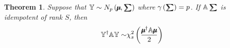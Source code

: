 \documentclass{article}
\newtheorem{theorem}{Theorem}
\begin{document}
\bigskip 

\begin{theorem}
Suppose that $\mathbb{Y}\sim N_{p}\left( \mathbb{%
\mu\mkern-12.3mu\mu%
},\mathbb{%
\tsum\mkern-20mu\tsum%
}\right) $ where $\gamma \left( \mathbb{%
\tsum\mkern-20mu\tsum%
}\right) =p$. If $\mathbb{A%
\tsum\mkern-20mu\tsum%
}$ is idempotent of rank $S$, then 
\begin{equation*}
\mathbb{Y}^{\mathbb{\dagger }}\mathbb{AY\sim }\chi _{s}^{2}\left( \frac{%
\mathbb{%
\mu\mkern-12.3mu\mu%
}^{\dagger }\mathbb{A%
\mu\mkern-12.3mu\mu%
}}{2}\right) 
\end{equation*}


\end{theorem}
\end{document}
